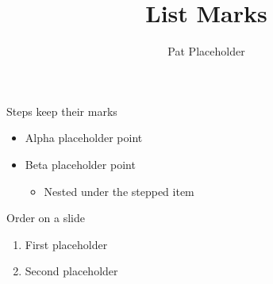 \documentclass[aspectratio=169]{beamer}
\title{List Marks}
\author{Pat Placeholder}
\date{}
\begin{document}
\maketitle

\begin{frame}{Steps keep their marks}
  \begin{itemize}
  \item<1-> Alpha placeholder point
  \item<2-> Beta placeholder point
    \begin{itemize}
    \item Nested under the stepped item
    \end{itemize}
  \end{itemize}
\end{frame}

\begin{frame}{Order on a slide}
  \begin{enumerate}
  \item First placeholder
  \item Second placeholder
  \end{enumerate}
\end{frame}
\end{document}
